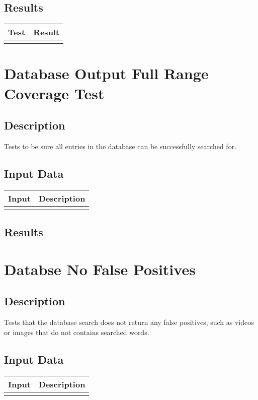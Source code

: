 \documentclass{scrreprt}
\begin{document}
\subsection{Results}
 \centering
 \begin{tabular}{||p{2.5cm}|p{2.5cm}||}
 \hline
 \textbf Test & \textbf Result\\
 \hline\hline
   &  \\ %
 \hline
 \end{tabular}

\section{Database Output Full Range Coverage Test}
\subsection{Description}
\begin{flushleft}
Tests to be sure all entries in the database can be successfully searched for.
\end{flushleft}
\subsection{Input Data}
 \centering
 \begin{tabular}{p{3cm}p{6cm}}
 \hline\hline
 Input & Description\\
 \hline\hline
   &  \\ %
 \hline
 \end{tabular}
\subsection{Results}

\section{Databse No False Positives}
\subsection{Description}
\begin{flushleft}
Tests that the database search does not return any false positives, such as videos or images that do not contains searched words.
\end{flushleft}
\subsection{Input Data}
 \centering
 \begin{tabular}{p{3cm}p{6cm}}
 \hline\hline
 Input & Description\\
 \hline\hline
   &  \\ %
 \hline
 \end{tabular}
\end{document}
